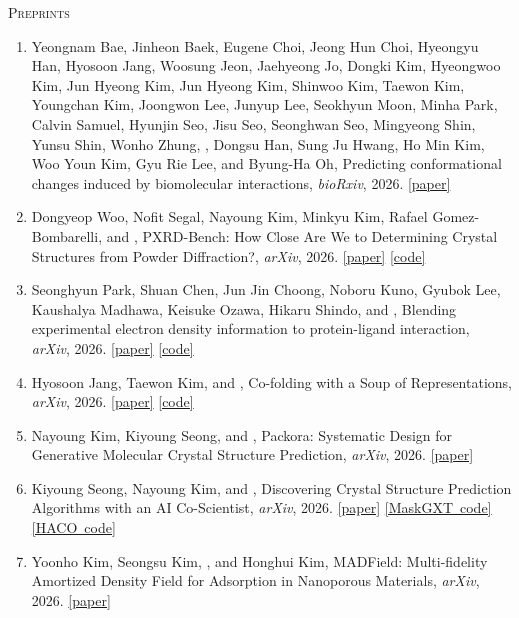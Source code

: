 \vspace{0.5\baselineskip}
\textsc{Preprints}
\begin{enumerate}
\item Yeongnam Bae, Jinheon Baek, Eugene Choi, Jeong Hun Choi, Hyeongyu Han, Hyosoon Jang, Woosung Jeon, Jaehyeong Jo, Dongki Kim, Hyeongwoo Kim, Jun Hyeong Kim, Jun Hyeong Kim, Shinwoo Kim, Taewon Kim, Youngchan Kim, Joongwon Lee, Junyup Lee, Seokhyun Moon, Minha Park, Calvin Samuel, Hyunjin Seo, Jisu Seo, Seonghwan Seo, Mingyeong Shin, Yunsu Shin, Wonho Zhung, , Dongsu Han, Sung Ju Hwang, Ho Min Kim, Woo Youn Kim, Gyu Rie Lee, and Byung-Ha Oh, Predicting conformational changes induced by biomolecular interactions, \textit{bioRxiv}, 2026. \mbox{\href{https://www.biorxiv.org/content/10.64898/2026.10.26.760299v1}{[paper]}}
\item Dongyeop Woo, Nofit Segal, Nayoung Kim, Minkyu Kim, Rafael Gomez-Bombarelli, and , PXRD-Bench: How Close Are We to Determining Crystal Structures from Powder Diffraction?, \textit{arXiv}, 2026. \mbox{\href{https://arxiv.org/abs/2610.16480}{[paper]}} \mbox{\href{https://github.com/dongyeop3813/PXRD-Bench}{[code]}}
\item Seonghyun Park, Shuan Chen, Jun Jin Choong, Noboru Kuno, Gyubok Lee, Kaushalya Madhawa, Keisuke Ozawa, Hikaru Shindo, and , Blending experimental electron density information to protein-ligand interaction, \textit{arXiv}, 2026. \mbox{\href{https://arxiv.org/abs/2610.14862}{[paper]}} \mbox{\href{https://github.com/seonghyun26/CoDE}{[code]}}
\item Hyosoon Jang, Taewon Kim, and , Co-folding with a Soup of Representations, \textit{arXiv}, 2026. \mbox{\href{https://arxiv.org/abs/2609.15552}{[paper]}} \mbox{\href{https://github.com/hsjang0/soupfold}{[code]}}
\item Nayoung Kim, Kiyoung Seong, and , Packora: Systematic Design for Generative Molecular Crystal Structure Prediction, \textit{arXiv}, 2026. \mbox{\href{https://arxiv.org/abs/2608.26962}{[paper]}}
\item Kiyoung Seong, Nayoung Kim, and , Discovering Crystal Structure Prediction Algorithms with an AI Co-Scientist, \textit{arXiv}, 2026. \mbox{\href{https://arxiv.org/abs/2606.22866}{[paper]}} \mbox{\href{https://github.com/kiyoung98/maskgxt}{[MaskGXT code]}} \mbox{\href{https://github.com/kiyoung98/HACO}{[HACO code]}}
\item Yoonho Kim, Seongsu Kim, , and Honghui Kim, MADField: Multi-fidelity Amortized Density Field for Adsorption in Nanoporous Materials, \textit{arXiv}, 2026. \mbox{\href{https://arxiv.org/abs/2606.21284}{[paper]}}

\end{enumerate}
